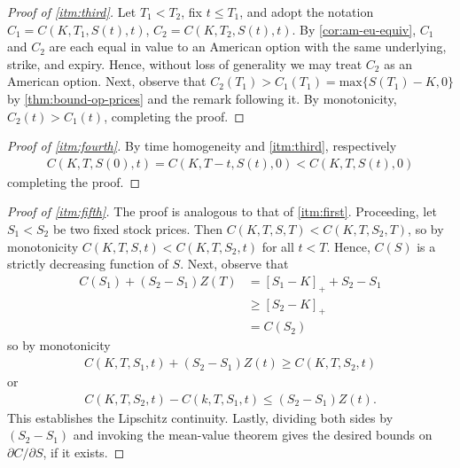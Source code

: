 \documentclass[12pt]{article}
\newcommand{\p}{\partial}
\theoremstyle{plain}
\theoremstyle{definition}
\theoremstyle{remark}
\numberwithin{equation}{section}  %
\begin{document}
\begin{proof}[Proof of \cref{itm:third}]
	Let $T_{1} < T_{2}$, fix $t \le T_{1}$, and
	adopt the notation
	$C_{1} = C(K, T_{1}, S(t), t)$, $C_{2} = C(K, T_{2}, S(t), t)$.  
	By \cref{cor:am-eu-equiv}, $C_{1}$ and $C_{2}$ are each equal in value to
	an American option with the same underlying, strike, and expiry. Hence,
	without loss of generality we
	may treat $C_{2}$ as an American option. Next, observe
	that $C_{2}(T_{1}) > C_{1}(T_{1}) = \text{max}\{S(T_{1})-K, 0\}$
	by \cref{thm:bound-op-prices} and the remark following it.
	By monotonicity, $C_{2}(t) >  
	C_{1}(t)$, completing the proof. 
\end{proof}
\begin{proof}[Proof of \cref{itm:fourth}]
	By time homogeneity and \cref{itm:third}, respectively
	\begin{equation*}
		\begin{split}
			C(K, T, S(0), t) = C(K, T-t, S(t), 0) < C(K, T, S(t), 0)
		\end{split}
	\end{equation*}
	completing the proof.
\end{proof}
\begin{proof}[Proof of \cref{itm:fifth}]
	The proof is analogous to that of \cref{itm:first}. Proceeding,
	let $S_{1} < S_{2}$ be two fixed stock prices. Then $C(K, T, S, T) <
	C(K, T, S_{2}, T)$, so by monotonicity
	$C(K, T, S, t) < C(K, T, S_{2}, t)$ for all $t < T$. Hence,
	$C(S)$ is a strictly decreasing function of $S$. Next, observe that
	\begin{equation*}
		\begin{split}
			C(S_{1}) + (S_{2} - S_{1})Z(T) 
			& = {[S_{1} - K]}_{+} + S_{2} - S_{1}
			\\
			& \ge {[S_{2} - K]}_{+}
			\\
			& = C(S_{2})
		\end{split}
	\end{equation*}
	so by monotonicity
	\begin{equation*}
		\begin{split}
			C(K, T, S_{1}, t) + (S_{2} - S_{1})Z(t) \ge C(K, T, S_{2}, t)
		\end{split}
	\end{equation*}
	or
	\begin{equation*}
		\begin{split}
			C(K, T, S_{2}, t) - C(k, T, S_{1}, t) \le (S_{2} - S_{1})Z(t).
		\end{split}
	\end{equation*}
	This establishes the Lipschitz continuity. Lastly, dividing both sides by
	$(S_{2} - S_{1})$ and invoking the mean-value theorem
	gives the desired bounds on $\p C/ \p S$, if it exists.
\end{proof}
\end{document}
